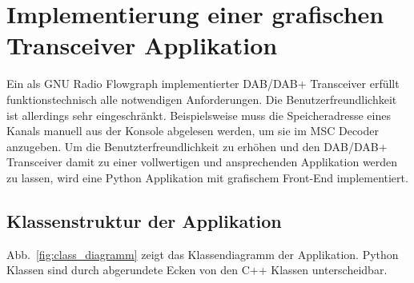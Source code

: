 \chapter{Implementierung einer grafischen Transceiver Applikation}
Ein als GNU Radio Flowgraph implementierter DAB/DAB+ Transceiver erfüllt funktionstechnisch alle notwendigen Anforderungen. Die Benutzerfreundlichkeit ist allerdings sehr eingeschränkt. Beispielsweise muss die Speicheradresse eines Kanals manuell aus der Konsole abgelesen werden, um sie im MSC Decoder anzugeben. Um die Benutzterfreundlichkeit zu erhöhen und den DAB/DAB+ Transceiver damit zu einer vollwertigen und ansprechenden Applikation werden zu lassen, wird eine Python Applikation mit grafischem Front-End implementiert.
\section{Klassenstruktur der Applikation}
Abb.~\ref{fig:class_diagramm} zeigt das Klassendiagramm der Applikation. Python Klassen sind durch abgerundete Ecken von den C++ Klassen unterscheidbar.

